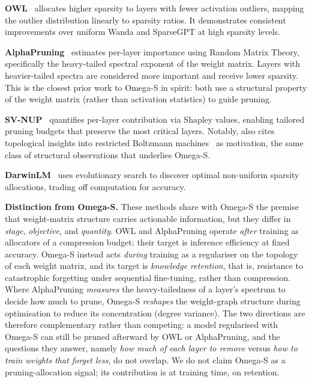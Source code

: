\documentclass[11pt,a4paper]{article}
\begin{document}
\textbf{OWL}~\cite{yin2024owl} allocates higher sparsity to layers with
fewer activation outliers, mapping the outlier distribution linearly to
sparsity ratios. It demonstrates consistent improvements over uniform Wanda
and SparseGPT at high sparsity levels.

\textbf{AlphaPruning}~\cite{lu2024alpha} estimates per-layer importance
using Random Matrix Theory, specifically the heavy-tailed spectral
exponent of the weight matrix. Layers with heavier-tailed spectra are
considered more important and receive lower sparsity. This is the closest
prior work to Omega-S in spirit: both use a structural property of the
weight matrix (rather than activation statistics) to guide pruning.

\textbf{SV-NUP}~\cite{svnup2025} quantifies per-layer contribution via
Shapley values, enabling tailored pruning budgets that preserve the most
critical layers. Notably, \cite{svnup2025} also cites topological insights
into restricted Boltzmann machines~\cite{mocanu2016} as motivation, the
same class of structural observations that underlies Omega-S.

\textbf{DarwinLM}~\cite{tang2025} uses evolutionary search to discover
optimal non-uniform sparsity allocations, trading off computation for
accuracy.

\textbf{Distinction from Omega-S.} These methods share with Omega-S the
premise that weight-matrix structure carries actionable information, but
they differ in \emph{stage}, \emph{objective}, and \emph{quantity}. OWL and
AlphaPruning operate \emph{after} training as allocators of a compression
budget; their target is inference efficiency at fixed accuracy. Omega-S
instead acts \emph{during} training as a regulariser on the topology of each
weight matrix, and its target is \emph{knowledge retention}, that is, resistance to
catastrophic forgetting under sequential fine-tuning, rather than
compression. Where AlphaPruning \emph{measures} the heavy-tailedness of a
layer's spectrum to decide how much to prune, Omega-S \emph{reshapes} the
weight-graph structure during optimisation to reduce its concentration
(degree variance). The two directions are therefore complementary rather
than competing: a model regularised with Omega-S can still be pruned
afterward by OWL or AlphaPruning, and the questions they answer, namely
\emph{how much of each layer to remove} versus \emph{how to train weights
that forget less}, do not overlap. We do not claim Omega-S as a pruning-allocation
signal; its contribution is at training time, on retention.
\end{document}
